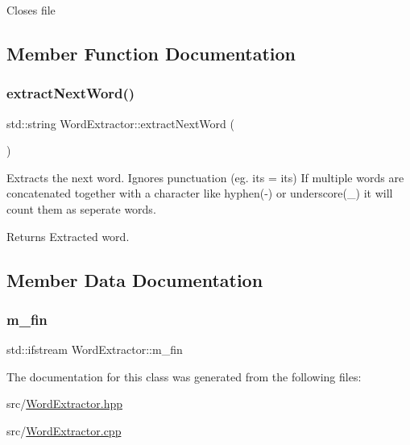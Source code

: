 Closes file 

\subsection{Member Function Documentation}
\mbox{\label{class_word_extractor_aae86b87d65bcfe432ec50c88fec4f464}} 
\subsubsection{\texorpdfstring{extract\+Next\+Word()}{extractNextWord()}}
{\footnotesize\ttfamily std\+::string Word\+Extractor\+::extract\+Next\+Word (\begin{DoxyParamCaption}{ }\end{DoxyParamCaption})}



Extracts the next word. Ignores punctuation (eg. it\textquotesingle{}s = its) If multiple words are concatenated together with a character like hyphen(-\/) or underscore(\+\_\+) it will count them as seperate words. 

\begin{DoxyReturn}{Returns}
Extracted word. 
\end{DoxyReturn}


\subsection{Member Data Documentation}
\mbox{\label{class_word_extractor_af189c1c3a30c9e06d5bda3ac358d0963}} 
\subsubsection{\texorpdfstring{m\+\_\+fin}{m\_fin}}
{\footnotesize\ttfamily std\+::ifstream Word\+Extractor\+::m\+\_\+fin\hspace{0.3cm}{\ttfamily [private]}}



The documentation for this class was generated from the following files\+:\begin{DoxyCompactItemize}
\item 
src/\mbox{\hyperlink{_word_extractor_8hpp}{Word\+Extractor.\+hpp}}\item 
src/\mbox{\hyperlink{_word_extractor_8cpp}{Word\+Extractor.\+cpp}}\end{DoxyCompactItemize}
